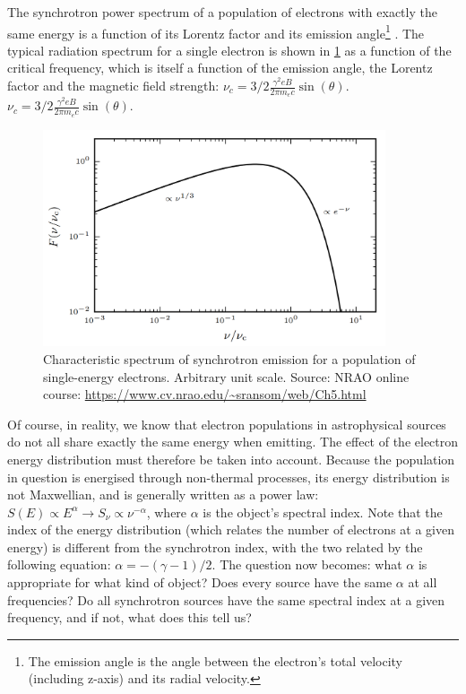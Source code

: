 \pg
The synchrotron power spectrum of a population of electrons with exactly the same energy is a function of its Lorentz factor and its emission angle\footnote{The emission angle is the angle between the electron's total velocity (including z-axis) and its radial velocity.} . The typical radiation spectrum for a single electron is shown in \cref{fig.synchrotron.1electrion} as a function of the critical frequency, which is itself a function of the emission angle, the Lorentz factor and the magnetic field strength: $\nu_c=3/2\frac{\gamma^2 e B}{2\pi m_e c}\sin(\theta)$.
$\nu_c=3/2\frac{\gamma^2 e B}{2\pi m_e c}\sin(\theta)$.
\begin{figure}[!h]
\centering
\includegraphics[width=0.9\textwidth]{images/Synchrotron-single-electron.png}
\caption{\label{fig.synchrotron.1electrion} Characteristic spectrum of synchrotron emission for a population of single-energy electrons. Arbitrary unit scale. Source: NRAO online course: \url{https://www.cv.nrao.edu/~sransom/web/Ch5.html}}
\end{figure}

\pg
Of course, in reality, we know that electron populations in astrophysical sources do not all share exactly the same energy when emitting. The effect of the electron energy distribution must therefore be taken into account. Because the population in question is energised through non-thermal processes, its energy distribution is not Maxwellian, and is generally written as a power law: $S(E) \propto E^\alpha \rightarrow S_\nu \propto \nu^{-\alpha}$, where $\alpha$ is the object's spectral index. Note that the index of the energy distribution (which relates the number of electrons at a given energy) is different from the synchrotron index, with the two related by the following equation: $\alpha=-(\gamma-1)/2$.
The question now becomes: what $\alpha$ is appropriate for what kind of object? Does every source have the same $\alpha$ at all frequencies? Do all synchrotron sources have the same spectral index at a given frequency, and if not, what does this tell us?

